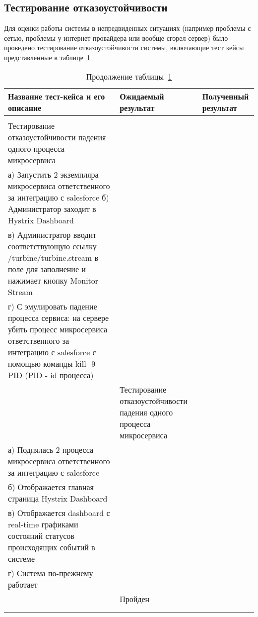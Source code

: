 \subsection{Тестирование отказоустойчивости}
Для оценки работы системы в непредвиденных ситуациях (например проблемы с сетью, проблемы у интернет провайдера или вообще сгорел сервер) было проведено тестирование отказоустойчивости системы, включающие тест кейсы представленные в таблице~\ref{table:testing:fb} 
\begin{longtable}[l]{| >{\raggedright}m{}
                  | >{\raggedright}m{}
                  | >{\raggedright\arraybackslash}m{}|}
  \caption{Тестирование отказоустойчивости системы}
  \label{table:testing:fb} \tabularnewline

  \hline
       Название тест-кейса и его описание & Ожидаемый результат  & Полученный результат \\
    \hline
    \centering{1} & \centering{2} & \centering{3} \tabularnewline
    \hline


    Тестирование отказоустойчивости падения одного процесса микросервиса \\
    а) Запустить 2 экземпляра микросервиса ответственного за интеграцию с salesforce
    б) Администратор заходит в Hystrix Dashboard \\
    в) Администратор вводит соответствующую ссылку /turbine/turbine.stream в поле для заполнение и нажимает кнопку Monitor Stream \\
    г) С эмулировать падение процесса сервиса: на сервере убить процесс микросервиса ответственного за интеграцию с salesforce с помощью команды kill -9 PID (PID - id процесса) \\
    & 
    Тестирование отказоустойчивости падения одного процесса микросервиса \\
    а) Поднялась 2 процесса микросервиса ответственного за интеграцию с salesforce \\
    б) Отображается главная страница Hystrix Dashboard \\
    в) Отображается dashboard с real-time графиками состояний статусов происходящих событий в системе \\
    г) Система по-прежнему работает \\
    & 
    Пройден \\ 

    \pagebreak
    \caption*{Продолжение таблицы~\ref{table:testing:fb}} \\
    \hline
    \centering 1 & \centering 2 & \centering 3 \tabularnewline
   

\end{longtable}

